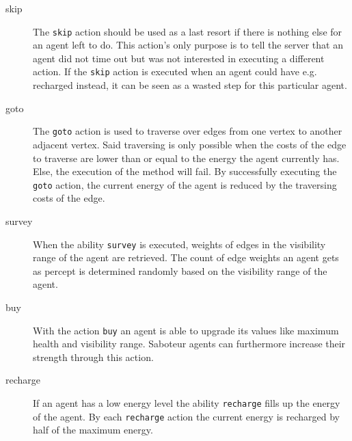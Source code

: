 \begin{description}
   \item[skip] The \texttt{skip} action should be used as a last resort if there is nothing else for an agent left to do.
    This action's only purpose is to tell the server that an agent did not time out but was not interested in executing a different action.
    If the \texttt{skip} action is executed when an agent could have e.g. recharged instead, it can be seen as a wasted step for this particular agent.
   \item[goto] The \texttt{goto} action is used to traverse over edges from one vertex to another adjacent vertex.
    Said traversing is only possible when the costs of the edge to traverse are lower than or equal to the energy the agent currently has.
    Else, the execution of the method will fail.
    By successfully executing the \texttt{goto} action, the current energy of the agent is reduced by the traversing costs of the edge.
   \item[survey] When the ability \texttt{survey} is executed, weights of edges in the visibility range of the agent are retrieved.
    The count of edge weights an agent gets as percept is determined randomly based on the visibility range of the agent.
   \item[buy] With the action \texttt{buy} an agent is able to upgrade its values like maximum health and visibility range.
    Saboteur agents can furthermore increase their strength through this action.
   \item[recharge] If an agent has a low energy level the ability \texttt{recharge} fills up the energy of the agent.
    By each \texttt{recharge} action the current energy is recharged by half of the maximum energy.
\end{description}

